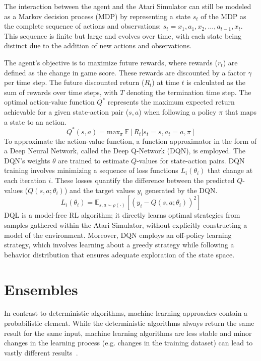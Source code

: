 The interaction between the agent and the Atari Simulator can still be modeled as a Markov decision process (MDP) by representing a state $s_t$ of the MDP as the complete sequence of actions and observations: $s_t = x_1, a_1, x_2, \dots, a_{t-1}, x_t$. This sequence is finite but large and evolves over time, with each state being distinct due to the addition of new actions and observations.

The agent's objective is to maximize future rewards, where rewards ($r_t$) are defined as the change in game score. These rewards are discounted by a factor $\gamma$ per time step. The future discounted return ($R_t$) at time $t$ is calculated as the sum of rewards over time steps, with $T$ denoting the termination time step. The optimal action-value function $Q^*$ represents the maximum expected return achievable for a given state-action pair ($s, a$) when following a policy $\pi$ that maps a state to an action.
$$Q^{*}(s, a) = \text{max}_{\pi}\ \mathbb{E}[ R_{t} | s_{t}= s, a_{t}=a, \pi]$$
To approximate the action-value function, a function approximator in the form of a Deep Neural Network, called the Deep Q-Network (DQN), is employed. The DQN's weights $\theta$ are trained to estimate $Q$-values for state-action pairs. DQN training involves minimizing a sequence of loss functions $L_i(\theta_i)$ that change at each iteration $i$. These losses quantify the difference between the predicted $Q$-values ($Q(s, a; \theta_i)$) and the target values $y_i$ generated by the DQN.
$$L_i\left(\theta_i\right)=\mathbb{E}_{s, a \sim \rho(\cdot)}\left[\left(y_i-Q\left(s, a ; \theta_i\right)\right)^2\right]$$
DQL is a model-free RL algorithm; it directly learns optimal strategies from samples gathered within the Atari Simulator, without explicitly constructing a model of the environment. Moreover, DQN employs an off-policy learning strategy, which involves learning about a greedy strategy while following a behavior distribution that ensures adequate exploration of the state space.

\section{Ensembles}

In contrast to deterministic algorithms, machine learning approaches contain a probabilistic element. While the deterministic algorithms always return the same result for the same input, machine learning algorithms are less stable and minor changes in the learning process (e.g. changes in the training dataset) can lead to vastly different results~\parencite{breiman_bagging_1996}.

